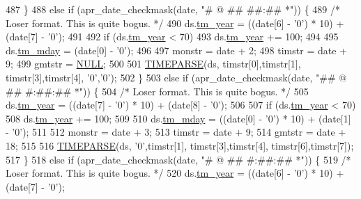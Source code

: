 \begin{DoxyCode}
487     \} 
488     \textcolor{keywordflow}{else} \textcolor{keywordflow}{if} (apr\_date\_checkmask(date, \textcolor{stringliteral}{"# @$$ ## ##:## *"})) \{
489         \textcolor{comment}{/* Loser format.  This is quite bogus.  */}
490         ds.\hyperlink{structapr__time__exp__t_a35c32245be49279a6689e34bcd6e534a}{tm\_year} = ((date[6] - \textcolor{charliteral}{'0'}) * 10) + (date[7] - \textcolor{charliteral}{'0'});
491 
492         \textcolor{keywordflow}{if} (ds.\hyperlink{structapr__time__exp__t_a35c32245be49279a6689e34bcd6e534a}{tm\_year} < 70)
493             ds.\hyperlink{structapr__time__exp__t_a35c32245be49279a6689e34bcd6e534a}{tm\_year} += 100;
494 
495         ds.\hyperlink{structapr__time__exp__t_a6c09a274f011841e9e988c3c9504848a}{tm\_mday} = (date[0] - \textcolor{charliteral}{'0'});
496 
497         monstr = date + 2;
498         timstr = date + 9;
499         gmtstr = \hyperlink{pcre_8txt_ad7f989d16aa8ca809a36bc392c07fba1}{NULL};
500 
501         \hyperlink{apr__date_8c_aa1f7825c136058e465186eb635d12f11}{TIMEPARSE}(ds, timstr[0],timstr[1], timstr[3],timstr[4], \textcolor{charliteral}{'0'},\textcolor{charliteral}{'0'});
502     \}
503     \textcolor{keywordflow}{else} \textcolor{keywordflow}{if} (apr\_date\_checkmask(date, \textcolor{stringliteral}{"## @$$ ## #:##:## *"})) \{
504         \textcolor{comment}{/* Loser format.  This is quite bogus.  */}
505         ds.\hyperlink{structapr__time__exp__t_a35c32245be49279a6689e34bcd6e534a}{tm\_year} = ((date[7] - \textcolor{charliteral}{'0'}) * 10) + (date[8] - \textcolor{charliteral}{'0'});
506 
507         \textcolor{keywordflow}{if} (ds.\hyperlink{structapr__time__exp__t_a35c32245be49279a6689e34bcd6e534a}{tm\_year} < 70)
508             ds.\hyperlink{structapr__time__exp__t_a35c32245be49279a6689e34bcd6e534a}{tm\_year} += 100;
509 
510         ds.\hyperlink{structapr__time__exp__t_a6c09a274f011841e9e988c3c9504848a}{tm\_mday} = ((date[0] - \textcolor{charliteral}{'0'}) * 10) + (date[1] - \textcolor{charliteral}{'0'});
511 
512         monstr = date + 3;
513         timstr = date + 9;
514         gmtstr = date + 18;
515 
516         \hyperlink{apr__date_8c_aa1f7825c136058e465186eb635d12f11}{TIMEPARSE}(ds, \textcolor{charliteral}{'0'},timstr[1], timstr[3],timstr[4], timstr[6],timstr[7]);
517     \}
518     \textcolor{keywordflow}{else} \textcolor{keywordflow}{if} (apr\_date\_checkmask(date, \textcolor{stringliteral}{"# @$$ ## #:##:## *"})) \{
519          \textcolor{comment}{/* Loser format.  This is quite bogus.  */}
520         ds.\hyperlink{structapr__time__exp__t_a35c32245be49279a6689e34bcd6e534a}{tm\_year} = ((date[6] - \textcolor{charliteral}{'0'}) * 10) + (date[7] - \textcolor{charliteral}{'0'});

\end{DoxyCode}
